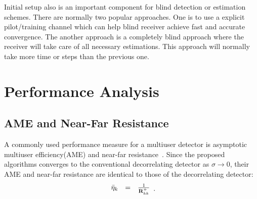 \documentclass[a4paper,10pt,fleqn, twocolumn]{IEEETran}
\newcommand{\bR}{{\bf R}}
\begin{document}
Initial setup also is an important component for blind detection
or estimation schemes. There are normally two popular approaches.
One is to use a explicit pilot/training channel which can help
blind receiver achieve fast and accurate convergence. The another
approach is a completely blind approach where the receiver will
take care of all necessary estimations. This approach will
normally take more time or steps than the previous one.

\section{Performance Analysis}

\subsection{AME and Near-Far Resistance}
A commonly used performance measure for a multiuser detector is
asymptotic multiuser efficiency(AME) and near-far
resistance~\cite{Verd98}. Since the proposed algorithms converges
to the conventional decorrelating detector as $\sigma\rightarrow
0$, their AME and near-far resistance are identical to those of
the decorrelating detector:
\begin{equation}
\begin{array}{rcl}
\bar{\eta}_k&=&\frac{1}{\bR_{kk}^{+}}
\end{array}.
\end{equation}
\end{document}
